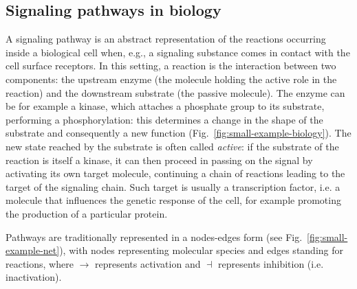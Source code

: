 \documentclass{llncs}
\begin{document}
\subsection{Signaling pathways in biology}\label{sec:biologia}
A signaling pathway is an abstract representation of the reactions occurring inside a biological cell when, e.g., a
signaling substance comes in contact with the cell surface receptors.
In this setting, a reaction is the interaction between
two components: the upstream enzyme (the molecule holding the active role in the reaction) and the downstream
substrate (the passive molecule). The enzyme can be for example a kinase, which attaches a phosphate group to its
substrate, performing a phosphorylation: this determines a change in the shape of the substrate
and consequently a new function (Fig.~\ref{fig:small-example-biology}).
The new state reached by the substrate
is often called \emph{active}: if the substrate of the reaction is itself a kinase, it can then proceed in passing
on the signal by activating its own target molecule, continuing a chain of reactions leading to the target
of the signaling chain. Such target is usually a transcription factor, i.e. a molecule that influences
the genetic response of the cell, for example promoting the production of a particular protein.

Pathways are traditionally represented in a nodes-edges form (see Fig.~\ref{fig:small-example-net}),
with nodes representing molecular species and edges standing for reactions, where $\rightarrow$ represents
activation and $\dashv$ represents inhibition (i.e. inactivation). 

\def\scalaRete{0.16}
\end{document}
